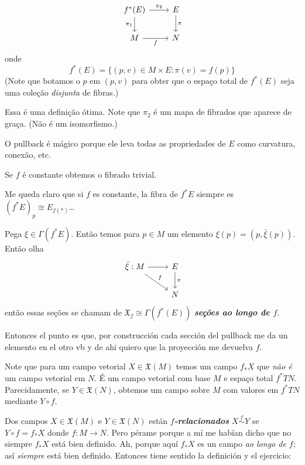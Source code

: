 \begin{defn}\leavevmode
\[\begin{tikzcd}
	f^* (E)\arrow[r,"\pi_2"]\arrow[d,"\pi_1",swap]&E\arrow[d,"\pi"]\\
	M\arrow[r,swap,"f"]&N
\end{tikzcd}\]
onde
\[f^*(E)=\{(p,v) \in M \times E: \pi(v)=f(p)\}\]
(Note que botamos o \(p\) em \((p,v)\) para obter que o espaço total de \(f^*(E)\) seja uma coleção \textit{disjunta} de fibras.)
\end{defn}
Essa é uma definição ótima. Note que \(\pi_2\) é um mapa de fibrados que aparece de graça. (Não é um isomorfismo.)

\begin{remark}\leavevmode
O pullback é mágico porque ele leva todas as propriedades de \(E\) como curvatura, conexão, etc.
\end{remark}

\begin{remark}\leavevmode
Se \(f\) é constante obtemos o fibrado trivial.
\end{remark}

\begin{question}\leavevmode
Me queda claro que si \(f\) es constante, la fibra de \(f^*E\) siempre es \((f^*E)_p \cong E_{f(*)}\)…
\end{question}

\begin{remark}\leavevmode
Pega  \(\xi \in\Gamma(f^* E)\). Então temos para \(p \in M\) um elemento \(\xi(p)=(p, \bar{\xi}(p)) \). Então olha
\[\begin{tikzcd}
	\bar{\xi} :M \arrow[r]\arrow[dr,"f"]&  E \arrow[d,"\pi"]\\& N
\end{tikzcd}\]
então essas seções se chamam de \(\mathfrak{X}_f \cong \Gamma(f^*(E))\) \textit{\textbf{seções ao longo de \(f\)}}.
\end{remark}
Entonces el punto es que, por construcción cada sección del pullback me da un elemento en el otro vb y de ahi quiero que la proyección me devuelva \(f\).

Note que para um campo vetorial \(X \in \mathfrak{X}(M)\) temos um campo \(f_*X\) que \textit{não é} um campo vetorial em \(N\). É um campo vetorial com base \(M\) e espaço total  \(f^*TN\). Parecidamente, se \(Y \in \mathfrak{X}(N)\), obtemos um campo sobre \(M\) com valores em \(f^*TN\) mediante \(Y \circ f\).
\begin{defn}\leavevmode
Dos campos \(X \in \mathfrak{X}(M)\) e \(Y \in \mathfrak{X}(N)\) están \textit{\textbf{\(f\)-relacionados}} \(X \overset{f}{\sim}Y\) se \(Y \circ f =f_*X\) donde \(f:M \to N\). Pero pérame porque a mí me habían dicho que no siempre \(f_*X\) está bien definido. Ah, porque aquí \(f_*X\) es un campo \textit{ao longo de \(f\)}; así \textit{siempre} está bien definido. Entonces tiene sentido la definición y el ejercicio:
\end{defn}

